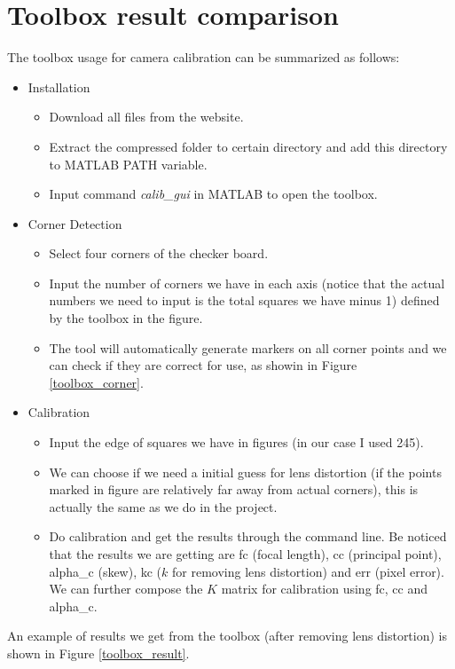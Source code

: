 \documentclass[conference]{IEEEtran}
\begin{document}
\section{Toolbox result comparison}
The toolbox usage for camera calibration can be summarized as follows:
\begin{itemize}
	\item Installation
	\begin{itemize}
		\item Download all files from the website.
		\item Extract the compressed folder to certain directory and add this directory to MATLAB PATH variable.
		\item Input command \emph{calib\_gui} in MATLAB to open the toolbox.
	\end{itemize}
	\item Corner Detection
	\begin{itemize}
		\item Select four corners of the checker board.
		\item Input the number of corners we have in each axis (notice that the actual numbers we need to input is the total squares we have minus 1) defined by the toolbox in the figure.
		\item The tool will automatically generate markers on all corner points and we can check if they are correct for use, as showin in Figure \ref{toolbox_corner}.
	\end{itemize}
	\item Calibration
	\begin{itemize}
		\item Input the edge of squares we have in figures (in our case I used 245).
		\item We can choose if we need a initial guess for lens distortion (if the points marked in figure are relatively far away from actual corners), this is actually the same as we do in the project.
		\item Do calibration and get the results through the command line. Be noticed that the results we are getting are fc (focal length), cc (principal point), alpha\_c (skew), kc ($k$ for removing lens distortion) and err (pixel error). We can further compose the $K$ matrix for calibration using fc, cc and alpha\_c.
	\end{itemize}
\end{itemize}
An example of results we get from the toolbox (after removing lens distortion) is shown in Figure \ref{toolbox_result}.
\end{document}
